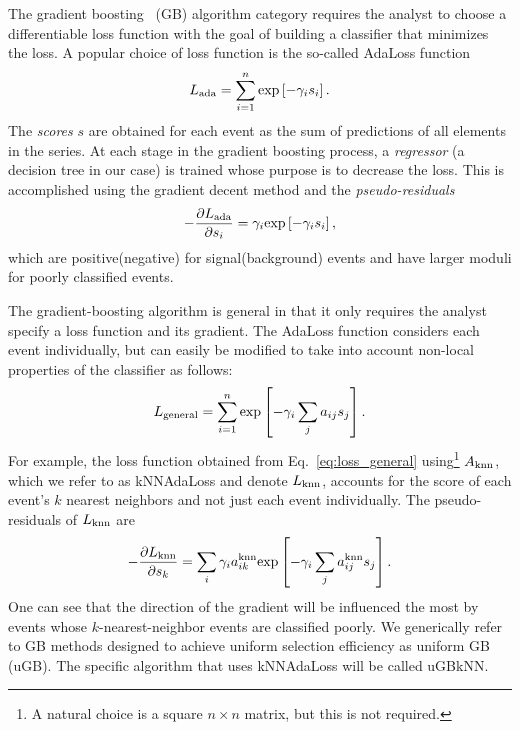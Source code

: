 The gradient boosting~\cite{ref:F1999} (GB) algorithm category requires the analyst to choose a differentiable loss function with the goal of building a classifier that minimizes the loss.  
A popular choice of loss function is the so-called AdaLoss function 
\begin{equation}
L_{\rm ada} = \sum\limits_{i=1}^{n} {\rm exp}\left[-\gamma_i s_i\right]. 
\end{equation}
The {\em scores} $s$ are obtained for each event as the sum of predictions of all elements in the series. 
At each stage in the gradient boosting process, a {\em regressor} (a decision tree in our case) is trained whose purpose is to decrease the loss.  This is accomplished using the gradient decent method and the {\em pseudo-residuals}
\begin{equation}
  -\frac{\partial L_{\rm ada}}{\partial s_i} = \gamma_i  {\rm exp}\left[-\gamma_i s_i\right],
\end{equation}
which are positive(negative) for signal(background) events and have larger moduli for poorly classified events.  

The gradient-boosting algorithm is general in that it only requires the analyst specify a loss function and its gradient.  The AdaLoss function considers each event individually, but can easily be modified to take into account non-local properties of the classifier as follows:
\begin{equation}
  \label{eq:loss_general}
  L_{\rm general} = \sum\limits_{i=1}^{n} {\rm exp}\left[-\gamma_i \sum\limits_{j} a_{ij} s_j \right]. 
\end{equation} 
For example, the loss function obtained from Eq.~\ref{eq:loss_general} using\footnote{A natural choice is a square $n\times n$ matrix, but this is not required.} 
$A_{\rm knn}$, which we refer to as kNNAdaLoss and denote $L_{\rm knn}$, accounts for the score of each event's $k$ nearest neighbors and not just each event individually.
The pseudo-residuals of $L_{\rm knn}$ are 
\begin{equation}
  -\frac{\partial L_{\rm knn}}{\partial s_k} = \sum\limits_i \gamma_i a_{ik}^{\rm knn} {\rm exp}\left[-\gamma_i \sum_j a_{ij}^{\rm knn} s_j \right].
\end{equation}
One can see that the direction of the gradient will be influenced the most by events whose $k$-nearest-neighbor events are classified poorly. 
We generically refer to GB methods designed to achieve uniform selection efficiency as uniform GB (uGB).  The specific algorithm that uses kNNAdaLoss will be called uGBkNN.  

